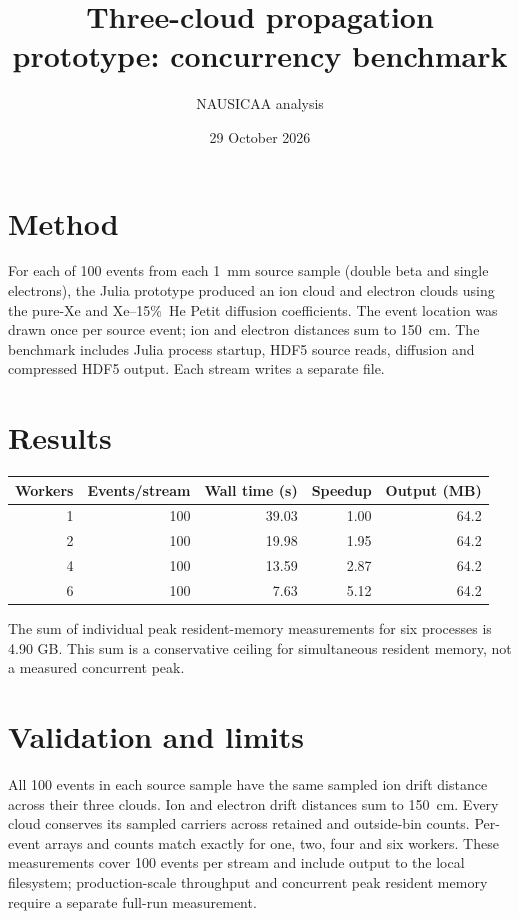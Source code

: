 \documentclass{article}
\title{Three-cloud propagation prototype: concurrency benchmark}
\author{NAUSICAA analysis}
\date{29 October 2026}
\begin{document}
\maketitle
\section*{Method}
For each of 100 events from each 1~mm source sample (double beta and single
electrons), the Julia prototype produced an ion cloud and electron clouds using
the pure-Xe and Xe--15\%~He Petit diffusion coefficients. The event location was
drawn once per source event; ion and electron distances sum to 150~cm. The
benchmark includes Julia process startup, HDF5 source reads, diffusion and
compressed HDF5 output. Each stream writes a separate file.

\section*{Results}
\begin{center}
\begin{tabular}{rrrrr}
\toprule
Workers & Events/stream & Wall time (s) & Speedup & Output (MB) \\
\midrule
1 & 100 & 39.03 & 1.00 & 64.2 \\
2 & 100 & 19.98 & 1.95 & 64.2 \\
4 & 100 & 13.59 & 2.87 & 64.2 \\
6 & 100 & 7.63 & 5.12 & 64.2 \\
\bottomrule
\end{tabular}
\end{center}
The sum of individual peak resident-memory measurements for six processes is 4.90 GB. This sum is a conservative ceiling for simultaneous resident memory, not a measured concurrent peak.

\section*{Validation and limits}
All 100 events in each source sample have the same sampled ion drift distance
across their three clouds. Ion and electron drift distances sum to 150~cm.
Every cloud conserves its sampled carriers across retained and outside-bin
counts. Per-event arrays and counts match exactly for one, two, four and six
workers. These measurements cover 100 events per stream and include output
to the local filesystem; production-scale throughput and concurrent peak
resident memory require a separate full-run measurement.
\end{document}
